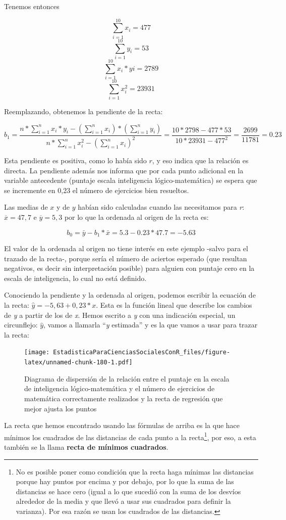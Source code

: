 \documentclass[]{book}
\let\rmarkdownfootnote\footnote%
\def\footnote{\protect\rmarkdownfootnote}
\begin{document}
Tenemos entonces

\[\sum_{i=1}^{10}x_i=477\]
\[\sum_{i=1}^{10}y_i=53\]
\[\sum_{i=1}^{10}x_i*yi=2789\]
\[\sum_{i=1}^{10}x_i^{2}=23931\]

Reemplazando, obtenemos la pendiente de la recta:

\[b_1=\frac{n*\sum_{i=1}^{n}{x_i*y_i}-(\sum_{i=1}^{n}x_i)*(\sum_{i=1}^{n}y_i)}{n*\sum_{i=1}^{n}x_i^{2}-(\sum_{i=1}^{n}x_i )^{2}}= \frac{10*2798-477*53}{10*23931-477^{2}}=\frac{2699}{11781}=0.23\]

Esta pendiente es positiva, como lo había sido \(r\), y eso indica que la relación es directa. La pendiente además nos informa que por cada punto adicional en la variable antecedente (puntaje escala inteligencia lógico-matemática) se espera que se incremente en 0,23 el número de ejercicios bien resueltos.

Las medias de \(x\) y de \(y\) habían sido calculadas cuando las necesitamos
para \emph{r}: \(\overline{x} = 47,7\) e \(\overline{y} = 5,3\) por lo que la
ordenada al origen de la recta es:

\[b_0=\bar{y}-b_1*\bar{x}=5.3-0.23*47.7=-5.63\]

El valor de la ordenada al origen no tiene interés en este ejemplo
-salvo para el trazado de la recta-, porque sería el número de aciertos esperado (que resultan negativos, es decir sin interpretación posible) para alguien con puntaje cero en la escala de inteligencia, lo cual no está definido.

Conociendo la pendiente y la ordenada al origen, podemos escribir la
ecuación de la recta: \(\widehat{y} = - 5,63 + 0,23*x\). Esta es la
función lineal que describe los cambios de \emph{y} a partir de los de \emph{x}.
Hemos escrito a \emph{y} con una indicación especial, un
circunflejo: \(\widehat{y}\), vamos a llamarla ``\emph{y} estimada'' y es la que
vamos a usar para trazar la recta:

\begin{figure}
\centering
\texttt{[image: EstadisticaParaCienciasSocialesConR\_files/figure-latex/unnamed-chunk-180-1.pdf]}
\caption{\label{fig:unnamed-chunk-180}Diagrama de dispersión de la relación entre el puntaje en la escala de inteligencia lógico-matemática y el número de ejercicios de matemática correctamente realizados y la recta de regresión que mejor ajusta los puntos}
\end{figure}

La recta que hemos encontrado usando las fórmulas de arriba es la que
hace mínimos los cuadrados de las distancias de cada punto a la
recta\footnote{No es posible poner como condición que la recta haga mínimas las distancias porque hay puntos por encima y por debajo, por lo que la suma de las distancias se hace cero (igual a lo que sucedió con la suma de los desvíos alrededor de la media y que llevó a usar sus cuadrados para definir la varianza). Por esa razón se usan los cuadrados de las distancias.}, por eso, a esta también se la llama \textbf{recta de mínimos cuadrados}.
\end{document}
